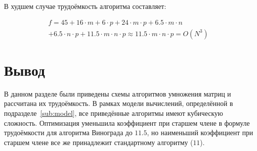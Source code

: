 В худшем случае трудоёмкость алгоритма составляет:

\begin{equation}
    \begin{gathered}
        f = 45 + 16\cdot m + 6 \cdot p + 24\cdot m\cdot p + 6.5 \cdot m \cdot n \\ + 6.5 \cdot n \cdot p + 11.5 \cdot m \cdot n \cdot p \approx 11.5 \cdot m \cdot n \cdot p = O(N^3)
    \end{gathered}
\end{equation}

\section*{Вывод}

В данном разделе были приведены схемы алгоритмов умножения матриц и рассчитана их трудоёмкость. В рамках модели вычислений, определённой в подразделе~\ref{sub:model}, все приведённые алгоритмы имеют кубическую сложность. Оптимизация уменьшила коэффициент при старшем члене в формуле трудоёмкости для алгоритма Винограда до $11.5$, но наименьший коэффициент при старшем члене все же принадлежит стандартному алгоритму ($11$).